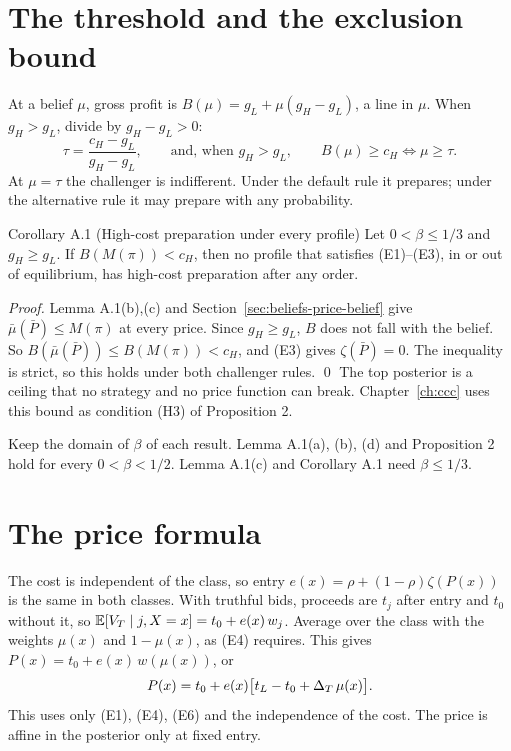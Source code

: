 \section{The threshold and the exclusion bound}\label{sec:beliefs-threshold}\label{sec:beliefs-exclusion}

At a belief \(\mu\), gross profit is \(B(\mu)=g_L+\mu(g_H-g_L)\), a line in \(\mu\). When \(g_H>g_L\), divide by \(g_H-g_L>0\):
\begin{equation}\label{eq:beliefs-threshold}
\tau=\frac{c_H-g_L}{g_H-g_L},\qquad\text{and, when }g_H>g_L,\qquad B(\mu)\ge c_H\iff\mu\ge\tau .
\end{equation}
At \(\mu=\tau\) the challenger is indifferent. Under the default rule it prepares; under the alternative rule it may prepare with any probability.

\begin{paperresult}{Corollary A.1 (High-cost preparation under every profile)}
Let \(0<\beta\le1/3\) and \(g_H\ge g_L\). If \(B(M(\pi))<c_H\), then no profile that satisfies (E1)--(E3), in or out of equilibrium, has high-cost preparation after any order.
\end{paperresult}

\emph{Proof.} Lemma A.1(b),(c) and Section~\ref{sec:beliefs-price-belief} give \(\bar\mu(\bar P)\le M(\pi)\) at every price. Since \(g_H\ge g_L\), \(B\) does not fall with the belief. So \(B(\bar\mu(\bar P))\le B(M(\pi))<c_H\), and (E3) gives \(\zeta(\bar P)=0\). The inequality is strict, so this holds under both challenger rules. \qed
The top posterior is a ceiling that no strategy and no price function can break. Chapter~\ref{ch:ccc} uses this bound as condition (H3) of Proposition 2.

\begin{watchout}
Keep the domain of \(\beta\) of each result. Lemma A.1(a), (b), (d) and Proposition 2 hold for every \(0<\beta<1/2\). Lemma A.1(c) and Corollary A.1 need \(\beta\le1/3\).
\end{watchout}

\section{The price formula}\label{sec:beliefs-priceformula}

The cost is independent of the class, so entry \(e(x)=\rho+(1-\rho)\zeta(P(x))\) is the same in both classes. With truthful bids, proceeds are \(t_j\) after entry and \(t_0\) without it, so \(\mathbb{E}[V_T\mid j,X=x]=t_0+e(x)\,w_j\). Average over the class with the weights \(\mu(x)\) and \(1-\mu(x)\), as (E4) requires. This gives \(P(x)=t_0+e(x)\,w(\mu(x))\), or
\begin{equation}\label{eq:beliefs-price}
P(x)=t_0+e(x)\bigl[t_L-t_0+\Delta_T\,\mu(x)\bigr].
\end{equation}
This uses only (E1), (E4), (E6) and the independence of the cost. The price is affine in the posterior only at fixed entry.

